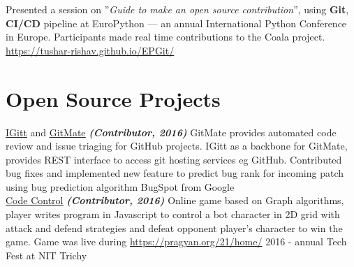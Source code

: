 \documentclass[]{deedy-resume-openfont}
\begin{document}
\begin{minipage}[t]{0.66\textwidth}
\begin{tightemize}
\item Presented a session on ”\textit{Guide to make an open source contribution}”, using \textbf{Git}, \textbf{CI/CD} pipeline at EuroPython — an annual International Python Conference in Europe. Participants made real time contributions to the Coala project. \href{https://tushar-rishav.github.io/EPGit/}{https://tushar-rishav.github.io/EPGit/}
\end{tightemize}
\sectionsep

\section{Open Source Projects}
\textbullet{} \href{https://gitlab.com/gitmate/open-source/IGitt}{\underline {IGitt}} and \href{https://gitlab.com/gitmate/open-source/gitmate-2}{\underline {GitMate}} {\footnotesize \textit{\textbf{(Contributor, 2016) }}} \textemdash GitMate provides automated code review and issue triaging for GitHub projects. IGitt as a backbone for GitMate, provides REST interface to access git hosting services eg GitHub. Contributed bug fixes and implemented new feature to predict bug rank for incoming patch using bug prediction algorithm BugSpot from Google \\
\textbullet{} \href{https://github.com/ash7594/code-control/commits?author=tushar-rishav}{\underline {Code Control}} {\footnotesize \textit{\textbf{(Contributor, 2016) }}} \textemdash Online game based on Graph algorithms, player writes program in Javascript to control a bot character in 2D grid with attack and defend strategies and defeat opponent player’s character to win the game. Game was live during \href{Pragyan}{https://pragyan.org/21/home/} 2016 - annual Tech Fest at NIT Trichy
\sectionsep

\end{minipage} 
\end{document}
